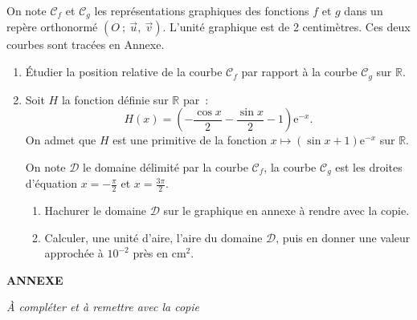 \medbreak
{}
\smallbreak
\par
\par
On note $\mathscr{C}_f$ et $\mathscr{C}_g$ les représentations graphiques des fonctions $f$ et $g$ dans un repère orthonormé $(O~;~\overrightarrow{u},~\overrightarrow{v})$. L'unité graphique est de 2 centimètres. Ces deux courbes sont tracées en Annexe.
\begin{enumerate}
     \item Étudier la position relative de la courbe $\mathscr{C}_f$ par rapport à la courbe $\mathscr{C}_g$ sur $\mathbb{R}$.
     \item Soit $H$ la fonction définie sur $\mathbb{R}$ par~:
     \[
     H(x)=\left(-\frac{\cos x}{2}-\frac{\sin x}{2}-1\right)\text{e}^{-x}.
     \]
     On admet que $H$ est une primitive de la fonction $x\mapsto (\sin x+1)\text{e}^{-x}$ sur $\mathbb{R}$.
     \par
     On note $\mathscr{D}$ le domaine délimité par la courbe $\mathscr{C}_f$, la courbe $\mathscr{C}_g$ est les droites d'équation $x=-\frac{\pi}{2}$ et $x=\frac{3\pi}{2}$.
     \begin{enumerate}[label=\alph*.]
          \item Hachurer le domaine $\mathscr{D}$ sur le graphique en annexe à rendre avec la copie.
          \item Calculer, une unité d'aire, l'aire du domaine $\mathscr{D}$, puis en donner une valeur approchée à $10^{-2}$ près en cm$^2$.
     \end{enumerate}
\end{enumerate}
\newpage
\begin{center}
     \bigbreak
     \textbf{ANNEXE}
     \par
     \textit{À compléter et à remettre avec la copie}
     \bigbreak
\bigskip
     \begin{extern} %
     \end{extern}
\end{center}
